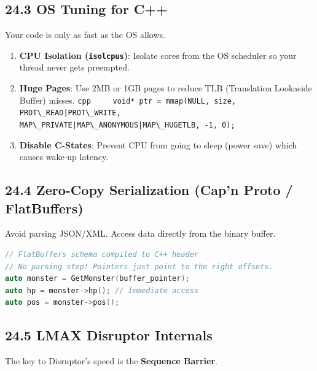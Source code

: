 \hypertarget{os-tuning-for-c}{%
\subsection{24.3 OS Tuning for C++}\label{os-tuning-for-c}}

Your code is only as fast as the OS allows.

\begin{enumerate}
\def\labelenumi{\arabic{enumi}.}
\tightlist
\item
  \textbf{CPU Isolation (\passthrough{\lstinline!isolcpus!})}: Isolate
  cores from the OS scheduler so your thread never gets preempted.
\item
  \textbf{Huge Pages}: Use 2MB or 1GB pages to reduce TLB (Translation
  Lookaside Buffer) misses.
  \passthrough{\lstinline!cpp     void* ptr = mmap(NULL, size, PROT\_READ|PROT\_WRITE,                       MAP\_PRIVATE|MAP\_ANONYMOUS|MAP\_HUGETLB, -1, 0);!}
\item
  \textbf{Disable C-States}: Prevent CPU from going to sleep (power
  save) which causes wake-up latency.
\end{enumerate}

\hypertarget{zero-copy-serialization-capn-proto-flatbuffers}{%
\subsection{24.4 Zero-Copy Serialization (Cap'n Proto /
FlatBuffers)}\label{zero-copy-serialization-capn-proto-flatbuffers}}

Avoid parsing JSON/XML. Access data directly from the binary buffer.

\begin{lstlisting}[language={C++}]
// FlatBuffers schema compiled to C++ header
// No parsing step! Pointers just point to the right offsets.
auto monster = GetMonster(buffer_pointer);
auto hp = monster->hp(); // Immediate access
auto pos = monster->pos();
\end{lstlisting}

\hypertarget{lmax-disruptor-internals}{%
\subsection{24.5 LMAX Disruptor
Internals}\label{lmax-disruptor-internals}}

The key to Disruptor's speed is the \textbf{Sequence Barrier}.

